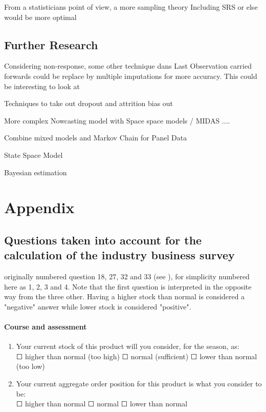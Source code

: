 \documentclass[12pt,a4paper,oneside]{book}
\begin{document}
From a statisticians point of view, a more sampling theory Including SRS or else would be more optimal


\section*{Further Research}


Considering non-response, some other technique dans Last Observation carried forwards could be replace by multiple imputations for more accuracy. This could be interesting to look at

Techniques to take out dropout and attrition bias out



More complex Nowcasting model with Space space models / MIDAS ....

Combine mixed models and Markov Chain for Panel Data \citep{de_haan-rietdijk_use_2017} 

State Space Model

Bayesian estimation \cite{bialowolski_bayesian_nodate}

\nocite{hlavac_stargazer:_2018}


 


  
\begin{appendix}
  \listoffigures
  \listoftables
\end{appendix}


\chapter*{Appendix}

\section*{Questions taken into account for the calculation of the industry business survey}
\label{Appendix: Question NS975 description}

originally numbered question 18, 27, 32 and 33 (see ), for simplicity numbered here as 1, 2, 3 and 4.
Note that the first question is interpreted in the opposite way from the three other. Having a higher stock than normal is considered a "negative" answer while lower stock is considered "positive".


\subsubsection*{Course and assessment}
\begin{enumerate}
    \item Your current stock of this product will you consider, for the season, as: \\
    $\Square$ higher than normal (too high) $\Square$ normal (sufficient) $\Square$ lower than normal (too low)
    
    \item Your current aggregate order position for this product is what you consider to be: \\
    $\Square$ higher than normal $\Square$ normal $\Square$ lower than normal
\end{enumerate}
\end{document}
